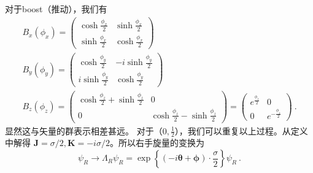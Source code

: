 对于boost（推动），我们有
\begin{equation}
\begin{array}{c}
B_{x}\left(\phi_{x}\right)=\left(\begin{array}{cc}
\cosh \frac{\phi_{x}}{2} & \sinh \frac{\phi_{x}}{2} \\
\sinh \frac{\phi_{x}}{2} & \cosh \frac{\phi_{x}}{2}
\end{array}\right) \\
B_{y}\left(\phi_{y}\right)=\left(\begin{array}{cc}
\cosh \frac{\phi_{y}}{2} & -i \sinh \frac{\phi_{y}}{2} \\
i \sinh \frac{\phi_{y}}{2} & \cosh \frac{\phi_{y}}{2}
\end{array}\right) \\
B_{z}\left(\phi_{z}\right)=\left(\begin{array}{cc}
\cosh \frac{\phi_{z}}{2}+\sinh \frac{\phi_{z}}{2} & 0 \\
0 & \cosh \frac{\phi_{z}}{2}-\sinh \frac{\phi_{z}}{2}
\end{array}\right)=\left(\begin{array}{cc}
e^{\frac{\phi_{z}}{2}} & 0 \\
0 & e^{-\frac{\phi_{z}}{2}}
\end{array}\right)~.
\end{array}
\end{equation}
显然这与矢量的群表示相差甚远。
对于（$0,\frac{1}{2}$），我们可以重复以上过程。从定义中解得 $\mathbf{J}=\sigma / 2 ,\mathbf{K}=-i \sigma / 2$。所以右手旋量的变换为
\begin{equation}
\psi_{R} \rightarrow \Lambda_{R} \psi_{R}=\exp \left\{(-i \boldsymbol{\theta}+\boldsymbol{\phi}) \cdot \frac{\sigma}{2}\right\} \psi_{R}~.
\end{equation}

